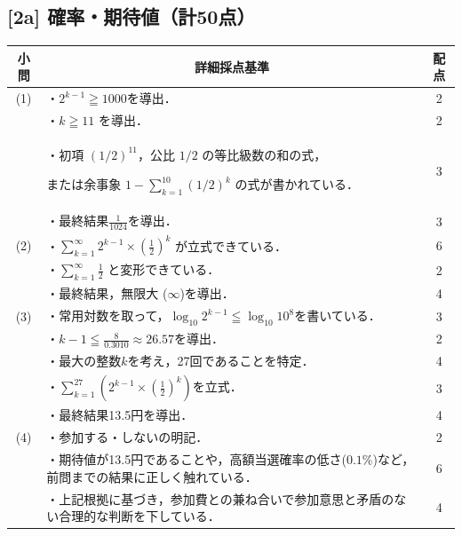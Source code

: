 \documentclass[dvipdfmx]{jlreq}
\theoremstyle{definition}
\begin{document}
\subsection*{[2a] 確率・期待値（計50点）}
\begin{longtable}{|c|p{11cm}|c|}
\hline
小問 & \multicolumn{1}{c|}{詳細採点基準} & 配点 \\ \hline
(1) & ・$2^{k-1} \geqq 1000$を導出． & 2\\
    & ・$k \geqq 11$ を導出．& 2 \\
    & ・初項 $(1/2)^{11}$，公比 $1/2$ の等比級数の和の式，\par または余事象 $1 - \sum_{k=1}^{10}(1/2)^k$ の式が書かれている． & 3 \\
    & ・最終結果$\frac{1}{1024}$を導出． & 3 \\ \hline
(2) & ・$\sum_{k=1}^{\infty} 2^{k-1} \times \left(\frac{1}{2}\right)^k$ が立式できている． & 6 \\
    & ・$\sum_{k=1}^{\infty} \frac{1}{2}$ と変形できている． & 2 \\
    & ・最終結果，無限大 ($\infty$)を導出． & 4 \\ \hline
(3) & ・常用対数を取って，$\log_{10} 2^{k-1} \leqq \log_{10} 10^8$を書いている．& 3 \\
    & ・$k-1 \leqq \frac{8}{0.3010} \approx 26.57$を導出．& 2 \\
    & ・最大の整数$k$を考え，27回であることを特定． & 4 \\
    & ・$\sum_{k=1}^{27} \left( 2^{k-1} \times \left(\frac{1}{2}\right)^k \right)$を立式．& 3 \\
    & ・最終結果13.5円を導出． & 4 \\ \hline
(4) & ・参加する・しないの明記． & 2 \\
    & ・期待値が13.5円であることや，高額当選確率の低さ($0.1\%$)など，前問までの結果に正しく触れている． & 6 \\
    & ・上記根拠に基づき，参加費との兼ね合いで参加意思と矛盾のない合理的な判断を下している． & 4 \\ \hline
\end{longtable}

\newpage
\end{document}
